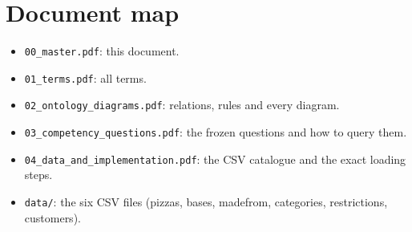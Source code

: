 \documentclass[11pt,a4paper]{article}
\begin{document}
\section*{Document map}
\begin{itemize}[leftmargin=*, itemsep=2pt]
\item \texttt{00\_master.pdf}: this document.
\item \texttt{01\_terms.pdf}: all terms.
\item \texttt{02\_ontology\_diagrams.pdf}: relations, rules and every diagram.
\item \texttt{03\_competency\_questions.pdf}: the frozen questions and how to query them.
\item \texttt{04\_data\_and\_implementation.pdf}: the CSV catalogue and the exact loading steps.
\item \texttt{data/}: the six CSV files (pizzas, bases, madefrom, categories, restrictions, customers).
\end{itemize}
\end{document}
